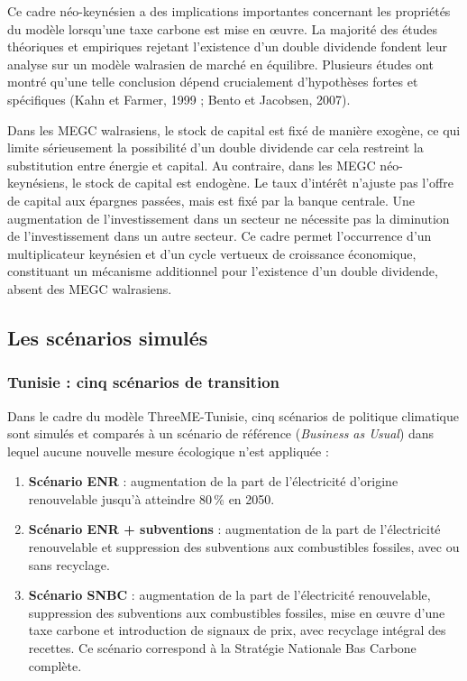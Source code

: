 \documentclass[12pt, a4paper]{article}
\begin{document}
Ce cadre néo-keynésien a des implications importantes concernant les propriétés du modèle lorsqu'une taxe carbone est mise en \oe{}uvre. La majorité des études théoriques et empiriques rejetant l'existence d'un double dividende fondent leur analyse sur un modèle walrasien de marché en équilibre. Plusieurs études ont montré qu'une telle conclusion dépend crucialement d'hypothèses fortes et spécifiques (Kahn et Farmer, 1999 ; Bento et Jacobsen, 2007).

Dans les MEGC walrasiens, le stock de capital est fixé de manière exogène, ce qui limite sérieusement la possibilité d'un double dividende car cela restreint la substitution entre énergie et capital. Au contraire, dans les MEGC néo-keynésiens, le stock de capital est endogène. Le taux d'intérêt n'ajuste pas l'offre de capital aux épargnes passées, mais est fixé par la banque centrale. Une augmentation de l'investissement dans un secteur ne nécessite pas la diminution de l'investissement dans un autre secteur. Ce cadre permet l'occurrence d'un multiplicateur keynésien et d'un cycle vertueux de croissance économique, constituant un mécanisme additionnel pour l'existence d'un double dividende, absent des MEGC walrasiens.

\subsection{Les scénarios simulés}
\label{subsec:scenarios}

\subsubsection{Tunisie : cinq scénarios de transition}

Dans le cadre du modèle ThreeME-Tunisie, cinq scénarios de politique climatique sont simulés et comparés à un scénario de référence (\textit{Business as Usual}) dans lequel aucune nouvelle mesure écologique n'est appliquée :

\begin{enumerate}[label=(\roman*)]
    \item \textbf{Scénario ENR} : augmentation de la part de l'électricité d'origine renouvelable jusqu'à atteindre 80\,\% en 2050.
    \item \textbf{Scénario ENR + subventions} : augmentation de la part de l'électricité renouvelable et suppression des subventions aux combustibles fossiles, avec ou sans recyclage.
    \item \textbf{Scénario SNBC} : augmentation de la part de l'électricité renouvelable, suppression des subventions aux combustibles fossiles, mise en \oe{}uvre d'une taxe carbone et introduction de signaux de prix, avec recyclage intégral des recettes. Ce scénario correspond à la Stratégie Nationale Bas Carbone complète.
\end{enumerate}
\end{document}
